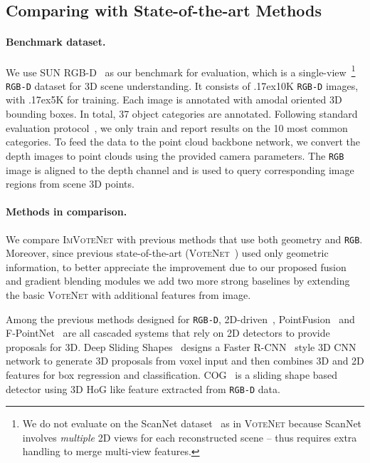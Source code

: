 \documentclass[10pt,twocolumn,letterpaper]{article}
\newcommand{\votenet}{\textsc{VoteNet}\xspace}
\newcommand{\imvotenet}{\textsc{ImVoteNet}\xspace}
\newcommand{\rgbd}{\texttt{RGB-D}\xspace}
\newcommand{\rgb}{\texttt{RGB}\xspace}
\newcommand{\app}{\raise.17ex\hbox{}}
\begin{document}
\subsection{Comparing with State-of-the-art Methods}
\label{sec:exp:sota}
\paragraph{Benchmark dataset.}
\label{sec:exp:benchmark}
We use SUN RGB-D~\cite{silberman2012indoor,janoch2013category,xiao2013sun3d,song2015sun} as our benchmark for evaluation, which is a single-view~\footnote{We do not evaluate on the ScanNet dataset~\cite{dai2017scannet} as in \votenet because ScanNet involves \emph{multiple} 2D views for each reconstructed scene -- thus requires extra handling to merge multi-view features.} \rgbd dataset for 3D scene understanding. It consists of \app10K \rgbd images, with \app5K for training. Each image is annotated with amodal oriented 3D bounding boxes. In total, 37 object categories are annotated. Following standard evaluation protocol~\cite{song2016deep}, we only train and report results on the 10 most common categories. To feed the data to the point cloud backbone network, we convert the depth images to point clouds using the provided camera parameters. The \rgb image is aligned to the depth channel and is used to query corresponding image regions from scene 3D points.
\paragraph{Methods in comparison.}
\label{sec:exp:method}
We compare \imvotenet with previous methods that use both geometry and \rgb. Moreover, since previous state-of-the-art (\votenet~\cite{voteNet}) used only geometric information, to better appreciate the improvement due to our proposed fusion and gradient blending modules we add two more strong baselines by extending the basic \votenet with additional features from image.

Among the previous methods designed for \rgbd, 2D-driven~\cite{lahoud20172d}, PointFusion~\cite{xu2018pointfusion} and F-PointNet~\cite{qi2018frustum} are all cascaded systems that rely on 2D detectors to provide proposals for 3D.
Deep Sliding Shapes~\cite{song2016deep} designs a Faster R-CNN~\cite{ren2015faster} style 3D CNN network to generate 3D proposals from voxel input and then combines 3D and 2D \roi features for box regression and classification. COG~\cite{ren2016three} is a sliding shape based detector using 3D HoG like feature extracted from \rgbd data.
\end{document}
